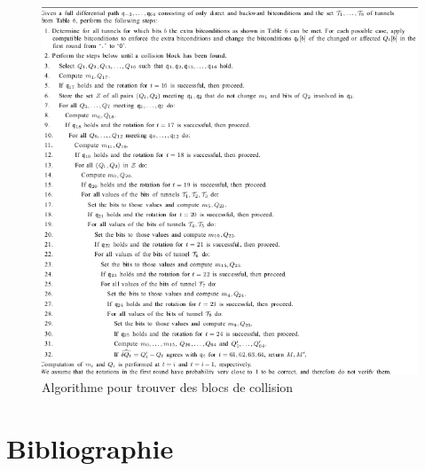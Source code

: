 \documentclass[a4paper,11pt,french]{article}
\begin{document}
\begin{figure}[h!]
  \includegraphics[scale=.82]{./pics/fcb.png}
  \caption{Algorithme pour trouver des blocs de collision}
\end{figure}



\newpage

\section{Bibliographie}




\end{document}
